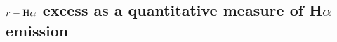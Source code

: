 \documentclass[a4paper,useAMS,usenatbib]{mn2e}
\def\ha{\mbox{H$\rm \alpha$}}
\begin{document}






\subsection{$r - \ha$ excess as a quantitative measure of H$\alpha$ emission}
\end{document}

